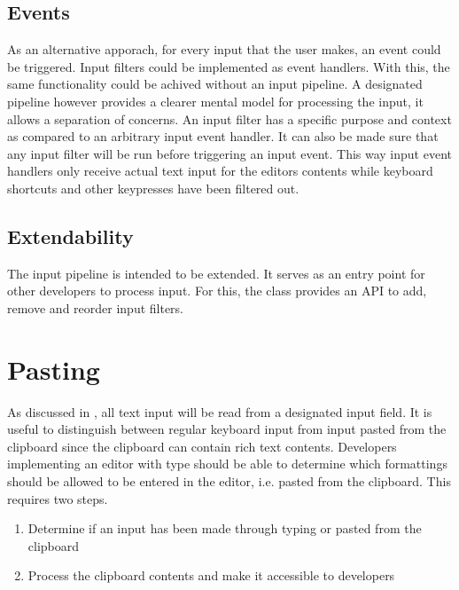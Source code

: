 \subsection{Events} As an alternative apporach, for every input that the user makes, an event could be triggered. Input filters could be implemented as event handlers. With this, the same functionality could be achived without an input pipeline. A designated pipeline however provides a clearer mental model for processing the input, it allows a separation of concerns. An input filter has a specific purpose and context as compared to an arbitrary input event handler. It can also be made sure that any input filter will be run before triggering an input event. This way input event handlers only receive actual text input for the editors contents while keyboard shortcuts and other keypresses have been filtered out.

\subsection{Extendability} The input pipeline is intended to be extended. It serves as an entry point for other developers to process input. For this, the  class provides an API to add, remove and reorder input filters.




\section{Pasting}

As discussed in , all text input will be read from a designated input field. It is useful to distinguish between regular keyboard input from input pasted from the clipboard since the clipboard can contain rich text contents. Developers implementing an editor with type should be able to determine which formattings should be allowed to be entered in the editor, i.e. pasted from the clipboard. This requires two steps.

\begin{enumerate}
\item Determine if an input has been made through typing or pasted from the clipboard
\item Process the clipboard contents and make it accessible to developers
\end{enumerate}

